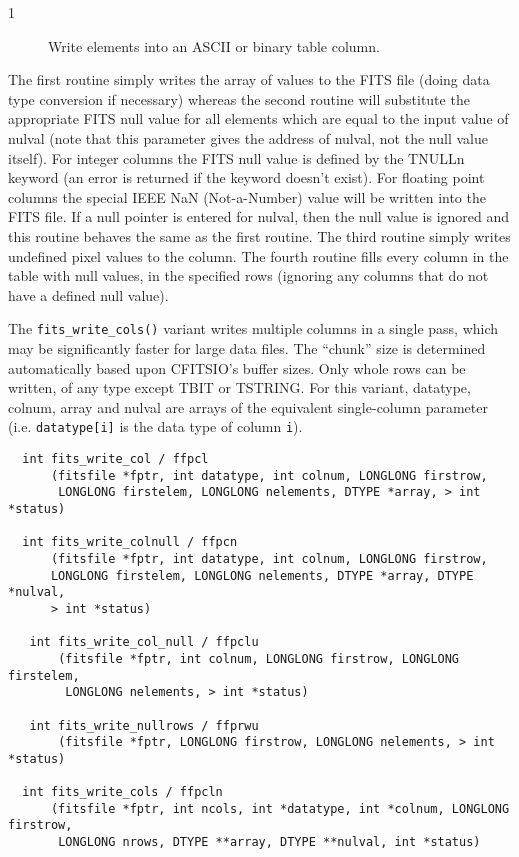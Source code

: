 \documentclass[11pt]{book}
\begin{document}
\begin{description}
\item[1 ] Write elements into an ASCII or binary table column.
\end{description}
   The first routine simply writes the array of values to the FITS file
   (doing data type conversion if necessary) whereas the second routine
   will substitute the  appropriate FITS null value for all elements
   which are equal to the input value of nulval (note that this
   parameter gives the address of nulval, not the null value
   itself).  For integer columns the FITS null value is defined by the
   TNULLn keyword (an error is returned if the keyword doesn't exist).
   For floating point columns  the special IEEE NaN (Not-a-Number)
   value will be written into the FITS file.  If a null pointer is
   entered for nulval, then the null value is ignored and this routine
   behaves the same as the first routine.  The third routine
   simply writes undefined pixel values to the column.  The fourth routine
   fills every column in the table with null values, in the specified
   rows (ignoring any columns that do not have a defined null value).

   The \verb+fits_write_cols()+ variant writes multiple columns in a
   single pass, which may be significantly faster for large data
   files.  The ``chunk'' size is determined automatically based upon
   CFITSIO's buffer sizes.  Only whole rows can be written, of any
   type except TBIT or TSTRING.  For this variant, datatype, colnum,
   array and nulval are arrays of the equivalent single-column
   parameter (i.e. \verb+datatype[i]+ is the data type of column
   \verb+i+). 

   \label{ffpcl} \label{ffpcn} \label{ffpclu} \label{ffpcln}

\begin{verbatim}
  int fits_write_col / ffpcl
      (fitsfile *fptr, int datatype, int colnum, LONGLONG firstrow,
       LONGLONG firstelem, LONGLONG nelements, DTYPE *array, > int *status)

  int fits_write_colnull / ffpcn
      (fitsfile *fptr, int datatype, int colnum, LONGLONG firstrow,
      LONGLONG firstelem, LONGLONG nelements, DTYPE *array, DTYPE *nulval,
      > int *status)

   int fits_write_col_null / ffpclu
       (fitsfile *fptr, int colnum, LONGLONG firstrow, LONGLONG firstelem,
        LONGLONG nelements, > int *status)

   int fits_write_nullrows / ffprwu
       (fitsfile *fptr, LONGLONG firstrow, LONGLONG nelements, > int *status)

  int fits_write_cols / ffpcln
      (fitsfile *fptr, int ncols, int *datatype, int *colnum, LONGLONG firstrow, 
       LONGLONG nrows, DTYPE **array, DTYPE **nulval, int *status)

\end{verbatim}
\end{document}

